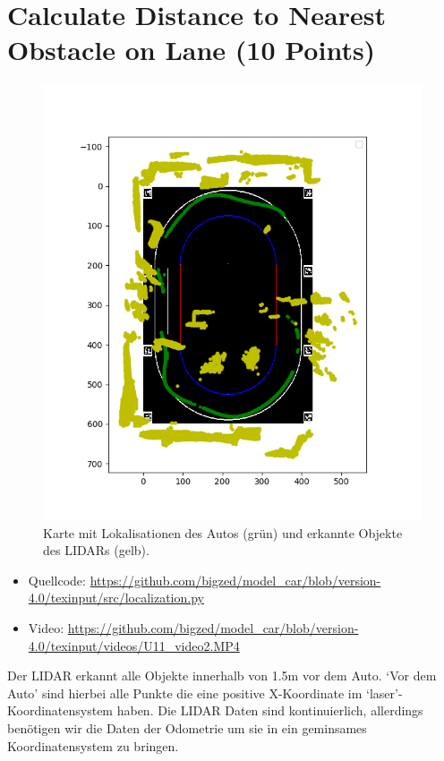\documentclass[10pt,oneside,a4paper]{article}
\begin{document}
  \section{Calculate Distance to Nearest Obstacle on Lane (10 Points)}
    \begin{figure}[h]
      \centering
      \includegraphics[scale=0.7]{pictures/circle_with_car_and_obstacles.png}
      \caption{Karte mit Lokalisationen des Autos (grün) und erkannte Objekte des LIDARs (gelb). }
    \end{figure}
    \begin{itemize}
      \item Quellcode: \url{https://github.com/bigzed/model_car/blob/version-4.0/texinput/src/localization.py}
      \item Video: \url{https://github.com/bigzed/model_car/blob/version-4.0/texinput/videos/U11_video2.MP4}
    \end{itemize}

	  Der LIDAR erkannt alle Objekte innerhalb von 1.5m vor dem Auto. `Vor dem Auto'  sind
    hierbei alle Punkte die eine positive X-Koordinate im `laser'-Koordinatensystem haben. Die
    LIDAR Daten sind kontinuierlich, allerdings ben\"otigen wir die Daten der Odometrie um sie
    in ein geminsames Koordinatensystem zu bringen.
\end{document}
